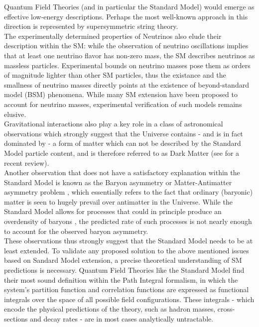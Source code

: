 Quantum Field Theories (and in particular the Standard Model) would emerge
as effective low-energy descriptions. Perhaps the most well-known approach in this
direction is represented by supersymmetric string theory.\\
The experimentally determined properties of Neutrinos also elude their description
within the SM: while the observation of neutrino oscillations implies
that at least one neutrino flavor has non-zero mass, the SM describes neutrinos
as massless particles. Experimental bounds on neutrino masses pose them as orders
of magnitude lighter than other SM particles, thus the existance and the smallness
of neutrino masses directly points at the existence of beyond-standard model
(BSM) phenomena. While many SM extension have been proposed to account for
neutrino masses, experimental verification of such models remains elusive.\\
Gravitational interactions also play a key role in a class of astronomical
observations which strongly suggest that the Universe contains - and is in fact 
dominated by - a form of matter which can not be described by the Standard Model 
particle content, and is therefore referred to as Dark Matter (see \cite{DMrev}
for a recent review).\\
Another observation that does not have a satisfactory explanation within the
Standard Model is known as the Baryon asymmetry or Matter-Antimatter asymmetry
problem \cite{BaryonAsy_rev}, which essentially refers to the fact that 
ordinary (baryonic) matter is seen to hugely prevail over antimatter in the 
Universe. While the Standard Model allows for processes that could in principle
produce an overdensity of baryons \cite{EWBar_rev}, the predicted rate of 
such processes is not nearly enough to account for the observed baryon asymmetry.\\
These observations thus strongly suggest that the Standard Model needs to be at 
least extended. 
To validate any proposed solution to the above mentioned issues based on 
Sandard Model extension, a precise theoretical understanding of SM predictions is 
necessary. Quantum Field Theories like the Standard Model find their most sound
definition within the Path Integral formalism, in which the system's partition
function and correlation functions are expressed as functional integrals over 
the space of all possible field configurations. These integrals - which encode
the physical predictions of the theory, such as hadron masses, cross-sections 
and decay rates - are in most cases analytically untractable.  
